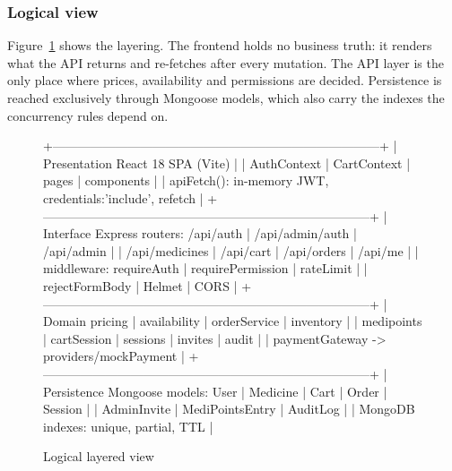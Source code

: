 \documentclass[11pt,a4paper]{article}
\begin{document}
\subsubsection{Logical view}
Figure~\ref{fig:layers} shows the layering. The frontend holds no business truth: it
renders what the API returns and re-fetches after every mutation. The API layer is the
only place where prices, availability and permissions are decided. Persistence is
reached exclusively through Mongoose models, which also carry the indexes the
concurrency rules depend on.

\begin{figure}[H]
\centering
\begin{asciiart}
+------------------------------------------------------------------------------+
| Presentation   React 18 SPA (Vite)                                          |
|                AuthContext | CartContext | pages | components               |
|                apiFetch(): in-memory JWT, credentials:'include', refetch     |
+------------------------------------------------------------------------------+
| Interface      Express routers: /api/auth | /api/admin/auth | /api/admin     |
|                /api/medicines | /api/cart | /api/orders | /api/me            |
|                middleware: requireAuth | requirePermission | rateLimit      |
|                            rejectFormBody | Helmet | CORS                   |
+------------------------------------------------------------------------------+
| Domain         pricing | availability | orderService | inventory            |
|                medipoints | cartSession | sessions | invites | audit        |
|                paymentGateway -> providers/mockPayment                       |
+------------------------------------------------------------------------------+
| Persistence    Mongoose models: User | Medicine | Cart | Order | Session    |
|                AdminInvite | MediPointsEntry | AuditLog                     |
|                MongoDB indexes: unique, partial, TTL                        |
\end{asciiart}
\caption{Logical layered view}\label{fig:layers}
\end{figure}
\end{document}
